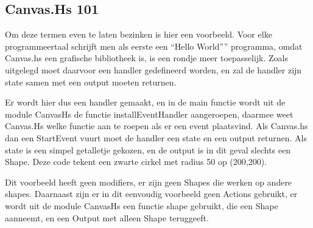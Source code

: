 \subsection{Canvas.Hs 101}
Om deze termen even te laten bezinken is hier een voorbeeld. Voor elke programmeertaal schrijft men als eerste een ``Hello World'''' programma, omdat Canvas.hs een grafische bibliotheek is, is een rondje meer toepasselijk. Zoals uitgelegd moet daarvoor een handler gedefineerd worden, en zal de handler zijn state samen met een output moeten returnen.



Er wordt hier dus een handler gemaakt, en in de main functie wordt uit de module CanvasHs de functie installEventHandler aangeroepen, daarmee weet Canvas.Hs welke functie aan te roepen als er een event plaatsvind. Als Canvas.hs dan een StartEvent vuurt moet de handler een state en een output returnen. Als state is een simpel getalletje gekozen, en de output is in dit geval slechts een Shape. Deze code tekent een zwarte cirkel met radius 50 op (200,200).

Dit voorbeeld heeft geen modifiers, er zijn geen Shapes die werken op andere shapes. Daarnaast zijn er in dit eenvoudig voorbeeld geen Actions gebruikt, er wordt uit de module CanvasHs een functie shape gebruikt, die een Shape aanneemt, en een Output met alleen Shape teruggeeft.
